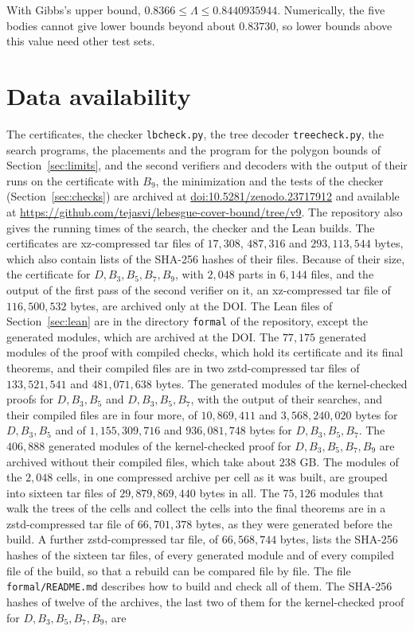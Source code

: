 \documentclass[11pt]{amsart}
\theoremstyle{definition}
\theoremstyle{remark}
\numberwithin{equation}{section}
\newcommand{\LBFIVE}{0.8366}
\newcommand{\ArchThree}{$17{,}308$}
\newcommand{\ArchFour}{$487{,}316$}
\newcommand{\ArchFive}{$293{,}113{,}544$}
\newcommand{\PartsFive}{$2{,}048$}
\newcommand{\ArchPassOne}{$116{,}500{,}532$}
\newcommand{\ArchLeanSrc}{$133{,}521{,}541$}
\newcommand{\ArchLeanOlean}{$481{,}071{,}638$}
\newcommand{\ArchKSrc}{$10{,}869{,}411$}
\newcommand{\ArchKOlean}{$3{,}568{,}240{,}020$}
\newcommand{\ArchKESrc}{$1{,}155{,}309{,}716$}
\newcommand{\ArchKEOlean}{$936{,}081{,}748$}
\newcommand{\ModulesKEl}{406{,}888}
\newcommand{\NTarsKEl}{sixteen}
\newcommand{\ArchKElSrc}{$29{,}879{,}869{,}440$}
\newcommand{\ArchKElGlue}{$66{,}701{,}378$}
\newcommand{\ArchKElSums}{$66{,}568{,}744$}
\newcommand{\ZENODODOI}{10.5281/zenodo.23717912}
\newcommand{\REPOURL}{https://github.com/tejasvi/lebesgue-cover-bound/tree/v9}
\begin{document}
With Gibbs's upper bound, $\LBFIVE\le\Lambda\le0.8440935944$. Numerically, the five bodies cannot give lower bounds beyond about $0.83730$, so lower bounds above this value need other test sets.

\section*{Data availability}
The certificates, the checker \texttt{lbcheck.py}, the tree decoder \texttt{treecheck.py}, the search programs, the placements and the program for the polygon bounds of Section~\ref{sec:limits}, and the second verifiers and decoders with the output of their runs on the certificate with $B_9$, the minimization and the tests of the checker (Section~\ref{sec:checks}) are archived at \href{https://doi.org/\ZENODODOI}{doi:\ZENODODOI} and available at \url{\REPOURL}. The repository also gives the running times of the search, the checker and the Lean builds. The certificates are xz-compressed tar files of \ArchThree{}, \ArchFour{} and \ArchFive{} bytes, which also contain lists of the SHA-256 hashes of their files. Because of their size, the certificate for $D,B_3,B_5,B_7,B_9$, with \PartsFive{} parts in $6{,}144$ files, and the output of the first pass of the second verifier on it, an xz-compressed tar file of \ArchPassOne{} bytes, are archived only at the DOI. The Lean files of Section~\ref{sec:lean} are in the directory \texttt{formal} of the repository, except the generated modules, which are archived at the DOI. The $77{,}175$ generated modules of the proof with compiled checks, which hold its certificate and its final theorems, and their compiled files are in two zstd-compressed tar files of \ArchLeanSrc{} and \ArchLeanOlean{} bytes. The generated modules of the kernel-checked proofs for $D,B_3,B_5$ and $D,B_3,B_5,B_7$, with the output of their searches, and their compiled files are in four more, of \ArchKSrc{} and \ArchKOlean{} bytes for $D,B_3,B_5$ and of \ArchKESrc{} and \ArchKEOlean{} bytes for $D,B_3,B_5,B_7$. The $\ModulesKEl$ generated modules of the kernel-checked proof for $D,B_3,B_5,B_7,B_9$ are archived without their compiled files, which take about $238$ GB. The modules of the $2{,}048$ cells, in one compressed archive per cell as it was built, are grouped into \NTarsKEl{} tar files of \ArchKElSrc{} bytes in all. The $75{,}126$ modules that walk the trees of the cells and collect the cells into the final theorems are in a zstd-compressed tar file of \ArchKElGlue{} bytes, as they were generated before the build. A further zstd-compressed tar file, of \ArchKElSums{} bytes, lists the SHA-256 hashes of the \NTarsKEl{} tar files, of every generated module and of every compiled file of the build, so that a rebuild can be compared file by file. The file \texttt{formal/README.md} describes how to build and check all of them. The SHA-256 hashes of twelve of the archives, the last two of them for the kernel-checked proof for $D,B_3,B_5,B_7,B_9$, are
\end{document}
